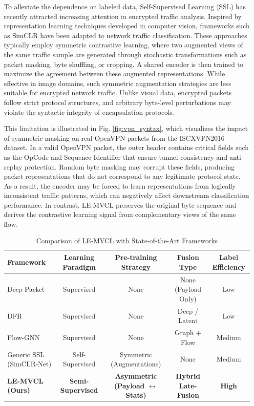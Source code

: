 To alleviate the dependence on labeled data, Self-Supervised Learning (SSL) has recently attracted increasing attention in encrypted traffic analysis. Inspired by representation learning techniques developed in computer vision, frameworks such as SimCLR \cite{chen2020simple} have been adapted to network traffic classification. These approaches typically employ symmetric contrastive learning, where two augmented views of the same traffic sample are generated through stochastic transformations such as packet masking, byte shuffling, or cropping. A shared encoder is then trained to maximize the agreement between these augmented representations. While effective in image domains, such symmetric augmentation strategies are less suitable for encrypted network traffic. Unlike visual data, encrypted packets follow strict protocol structures, and arbitrary byte-level perturbations may violate the syntactic integrity of encapsulation protocols. 

This limitation is illustrated in Fig. \ref{fig:vpn_syntax}, which visualizes the impact of symmetric masking on real OpenVPN packets from the ISCXVPN2016 dataset. In a valid OpenVPN packet, the outer header contains critical fields such as the OpCode and Sequence Identifier that ensure tunnel consistency and anti-replay protection. Random byte masking may corrupt these fields, producing packet representations that do not correspond to any legitimate protocol state. As a result, the encoder may be forced to learn representations from logically inconsistent traffic patterns, which can negatively affect downstream classification performance. In contrast, LE-MVCL preserves the original byte sequence and derives the contrastive learning signal from complementary views of the same flow.

\begin{table}[!htbp]
\caption{Comparison of LE-MVCL with State-of-the-Art Frameworks}
\label{tab:rw_comparison}
\centering
\begin{tabular}{l c c c c}
\hline
\textbf{Framework} & \textbf{Learning Paradigm} & \textbf{Pre-training Strategy} & \textbf{Fusion Type} & \textbf{Label Efficiency} \\
\hline
Deep Packet \cite{lotfollahi2020deep} & Supervised & None & None (Payload Only) & Low \\
DFR \cite{zeng2019deep} & Supervised & None & Deep / Latent & Low \\
Flow-GNN \cite{huoh2022flow} & Supervised & None & Graph + Flow & Medium \\
Generic SSL (SimCLR-Net) & Self-Supervised & Symmetric (Augmentations) & None & Medium \\
\textbf{LE-MVCL (Ours)} & \textbf{Semi-Supervised} & \textbf{Asymmetric (Payload $\leftrightarrow$ Stats)} & \textbf{Hybrid Late-Fusion} & \textbf{High} \\
\hline
\end{tabular}
\end{table}

